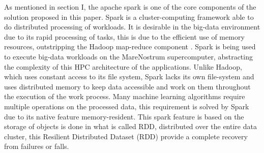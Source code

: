 \documentclass[journal]{IEEEtran}
\begin{document}
As mentioned in section I, the apache spark is one of the core components of the solution proposed in this paper. Spark is a cluster-computing framework able to do distributed processing of workloads.   It is desirable in the big-data environment due to its rapid processing of tasks, this is due to the efficient use of memory resources, outstripping the Hadoop map-reduce component \cite{zaharia2012}. Spark is being used to execute big-data workloads on the MareNostrum supercomputer, abstracting the complexity of this HPC architecture of the applications. Unlike Hadoop, which uses constant access to its file system, Spark lacks its own file-system and uses distributed memory to keep data accessible and work on them throughout the execution of the work process. Many machine learning algorithms require multiple operations on the processed data, this requirement is solved by Spark due to its native feature memory-resident.  This spark feature is based on the storage of objects is done in what is called RDD, distributed over the entire data cluster, this Resilient Distributed Dataset (RDD) \cite{zaharia2012} provide a complete recovery from failures or falls.

\end{document}
